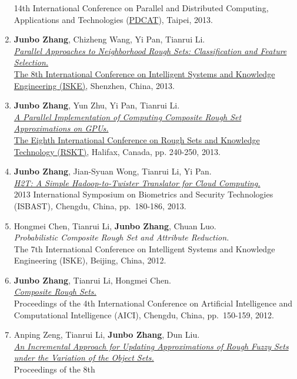 \documentclass[]{article}
\begin{document}
\begin{enumerate}
  14th International Conference on Parallel and Distributed Computing,
  Applications and Technologies
  (\href{http://pdcat13.csie.ntust.edu.tw/}{PDCAT}), Taipei, 2013.
\item
  \textbf{Junbo Zhang}, Chizheng Wang, Yi Pan, Tianrui Li.\\
  \href{}{\emph{Parallel Approaches to Neighborhood Rough Sets:
  Classification and Feature Selection.}}\\
  \href{http://kjb.szu.edu.cn/iske/}{The 8th International Conference on
  Intelligent Systems and Knowledge Engineering (ISKE)}, Shenzhen,
  China, 2013.
\item
  \textbf{Junbo Zhang}, Yun Zhu, Yi Pan, Tianrui Li.\\ \href{}{\emph{A
  Parallel Implementation of Computing Composite Rough Set
  Approximations on GPUs.}}\\ \href{http://cs.smu.ca/jrs2013/}{The
  Eighth International Conference on Rough Sets and Knowledge Technology
  (RSKT)}, Halifax, Canada, pp. 240-250, 2013.
\item
  \textbf{Junbo Zhang}, Jian-Syuan Wong, Tianrui Li, Yi Pan.\\
  \href{http://dx.doi.org/10.1109/ISBAST.2013.32}{\emph{H2T: A Simple
  Hadoop-to-Twister Translator for Cloud Computing.}}\\ 2013
  International Symposium on Biometrics and Security Technologies
  (ISBAST)\emph{,} Chengdu, China, pp.~180-186, 2013.
\item
  Hongmei Chen, Tianrui Li, \textbf{Junbo Zhang}, Chuan Luo.\\
  \emph{Probabilistic Composite Rough Set and Attribute Reduction.}\\
  The 7th International Conference on Intelligent Systems and Knowledge
  Engineering (ISKE), Beijing, China, 2012.
\item
  \textbf{Junbo Zhang}, Tianrui Li, Hongmei Chen.\\
  \href{http://www.springerlink.com/content/g621611026534074/?MUD=MP}{\emph{Composite
  Rough Sets.}}\\ Proceedings of the 4th International Conference on
  Artificial Intelligence and Computational Intelligence (AICI),
  Chengdu, China, pp.~150-159, 2012.
\item
  Anping Zeng, Tianrui Li, \textbf{Junbo Zhang}, Dun Liu.\\
  \href{http://dx.doi.org/10.1007/978-3-642-32115-3_4}{\emph{An
  Incremental Approach for Updating Approximations of Rough Fuzzy Sets
  under the Variation of the Object Sets.}}\\ Proceedings of the 8th

\end{enumerate}
\end{document}
